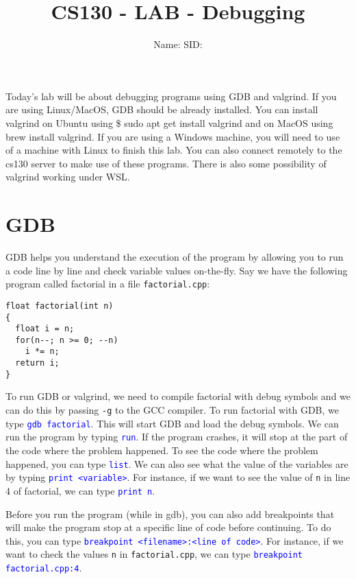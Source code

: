 \documentclass[12pt]{article}
\newcounter{problem}
\newcommand{\TODOL}[1]{\textcolor{red}{\underline{\hspace{#1 cm}}}}
\begin{document}
\title{CS130 - LAB - Debugging}
\date{}
\author{Name: \TODOL7\qquad\qquad SID: \TODOL4}
\maketitle
\begin{center}
\end{center}

\newcommand{\CM}[1]{\textcolor{blue}{\texttt{#1}}}

Today's lab will be about debugging programs using GDB and valgrind. If you are
using Linux/MacOS, GDB should be already installed. You can install valgrind on
Ubuntu using \$ sudo apt get install valgrind and on MacOS using brew install
valgrind. If you are using a Windows machine, you will need to use of a
machine with Linux to finish this lab.  You can also connect
remotely to the cs130 server to make use of these programs.  There is
also some possibility of valgrind working under WSL.

\section{GDB}

GDB helps you understand the execution of the program by allowing you to run a
code line by line and check variable values on-the-fly. Say we have the
following program called factorial in a file \texttt{factorial.cpp}:

\begin{lstlisting}
float factorial(int n)
{
  float i = n;
  for(n--; n >= 0; --n)
    i *= n;
  return i;
}
\end{lstlisting}

To run GDB or valgrind, we need to compile factorial with debug symbols and we
can do this by passing \texttt{-g} to the GCC compiler.  To run factorial with
GDB, we type \CM{gdb factorial}.  This will start GDB and load the debug symbols. We
can run the program by typing \CM{run}. If the program crashes, it will stop at the
part of the code where the problem happened. To see the code where the problem
happened, you can type \CM{list}. We can also see what the value of the variables are
by typing \CM{print <variable>}.  For instance, if we want to see the value
of \texttt{n} in line 4 of factorial, we can type \CM{print n}.

Before you run the program (while in gdb), you can also add breakpoints that will make the
program stop at a specific line of code before continuing.  To do this, you can
type \CM{breakpoint <filename>:<line of code>}. For instance, if we
want to check the values \texttt{n} in \texttt{factorial.cpp}, we can type
\CM{breakpoint factorial.cpp:4}.
\end{document}
